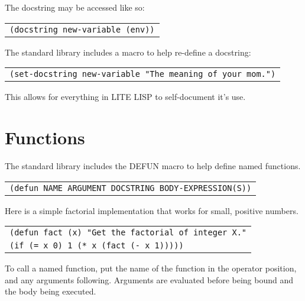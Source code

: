 \documentclass[
letterpaper,
oneside,
]{memoir}
\begin{document}
\filbreak

\noindent
The docstring may be accessed like so:

\vspace{1em}
\begin{tabular}{l}
  \texttt{(docstring new-variable (env))} \\
\end{tabular}
\vspace{1em}

\filbreak

\noindent
The standard library includes a macro to help re-define a docstring:

\vspace{1em}
\begin{tabular}{l}
  \verb|(set-docstring new-variable "The meaning of your mom.")| \\
\end{tabular}
\vspace{1em}

\noindent
This allows for everything in LITE LISP to self-document it’s use.

\filbreak

\chapter{Functions}

The standard library includes the DEFUN macro to help define named functions.

\vspace{1em}
\begin{tabular}{l}
  \texttt{(defun NAME ARGUMENT DOCSTRING BODY-EXPRESSION(S))} \\
\end{tabular}
\vspace{1em}

\noindent
Here is a simple factorial implementation that works for small, positive numbers.

\vspace{1em}
\begin{tabular}{l}
  \verb|(defun fact (x) "Get the factorial of integer X."| \\
  \qquad\verb|(if (= x 0) 1 (* x (fact (- x 1)))))| \\
\end{tabular}
\vspace{1em}

\noindent
To call a named function, put the name of the function in the operator position, and any arguments following. Arguments are evaluated before being bound and the body being executed.
\end{document}
